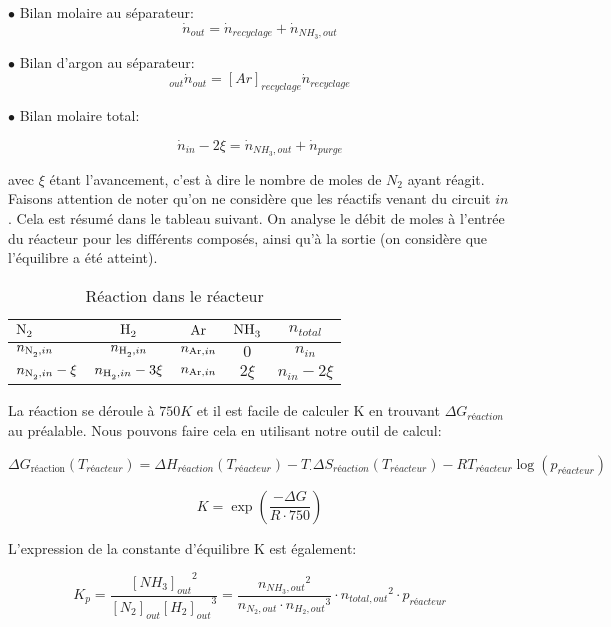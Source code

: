 \documentclass[a4paper, oneside, 12pt]{article}
\begin{document}
$\bullet$ Bilan molaire au séparateur:
\begin{equation}
\dot{n}_{out}=\dot{n}_{recyclage}+\dot{n}_{NH_3,out}
\end{equation}

$\bullet$ Bilan d'argon au séparateur:
\begin{equation}
[Ar]_{out} \dot{n}_{out}=[Ar]_{recyclage} \dot{n}_{recyclage}
\end{equation}

$\bullet$ Bilan molaire total:

\begin{equation}
	\dot{n}_{in} - 2\xi=\dot{n}_{NH_3,out} + \dot{n}_{purge}
\end{equation}

avec $\xi$ étant l'avancement, c'est à dire le nombre de moles de $N_2$ ayant réagit. 
Faisons attention de noter qu'on ne considère que les réactifs venant du circuit $in$. 
Cela est résumé dans le tableau suivant. 
On analyse le débit de moles à l'entrée du réacteur pour les différents composés, 
ainsi qu'à la sortie (on considère que l'équilibre a été atteint).

\begin{table}
	\centering
	\begin{tabular}{l|c|c|c|c}
		$\ce{N2}$ & $\ce{H2}$ & $\ce{Ar}$ & $\ce{NH3}$ & $n_{total}$ \\
		\hline
		$n_{\ce{N2},in}$ & $n_{\ce{H2},in}$ & $n_{\ce{Ar},in}$ & $0$  & $n_{in}$\\
		$n_{\ce{N2},in}-\xi$ & $n_{\ce{H2},in}-3\xi$ & $n_{\ce{Ar},in}$ & $2\xi$  & $n_{in}-2\xi$\\
	\end{tabular}
	\caption{Réaction dans le réacteur}
	\label{tab:reaction1_primaire}
\end{table}

La réaction se déroule à $750K$ et 
il est facile de calculer K en trouvant $\Delta G_{réaction}$ au préalable. 
Nous pouvons faire cela en utilisant notre outil de calcul: 

\[ 
\Delta G_{\text{réaction}}(T_{réacteur}) = 
\Delta H_{réaction}(T_{réacteur})-T_\cdot \Delta S_{réaction}(T_{réacteur})-RT_{réacteur}\log(p_{réacteur})
\]

\[
K=\exp(\frac{-\Delta G}{R\cdot 750})\]

L'expression de la constante d'équilibre K est également: 

\[
K_p=\frac{{[NH_3]_{out}}^2}{[N_2]_{out}{[H_2]_{out}}^3} = 
\frac{{n_{NH_3,out}}^2}{n_{N_2,out}\cdot {n_{H_2,out}}^3}\cdot {n_{total,out}}^2\cdot p_{réacteur}
\]
\end{document}
